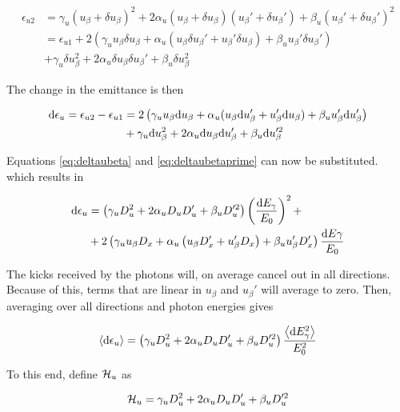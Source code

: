 \begin{align}
    \epsilon_{u2}   &= \gamma_u (u_\beta + \delta u_\beta)^2 + 2 \alpha_u (u_\beta + \delta u_\beta)(u_\beta' + \delta u_\beta') + \beta_u (u_\beta' + \delta u_\beta')^2\\
                    &= \epsilon_{u1} + 2 \left( \gamma_u u_\beta \delta u_\beta + \alpha_u (u_\beta \delta u_\beta' + u_\beta' \delta u_\beta) + \beta_u u_\beta' \delta u_\beta' \right)\\
                    &+ \gamma_u \delta u_\beta^2 + 2 \alpha_u \delta u_\beta \delta u_\beta' + \beta_u \delta u_\beta^2
\end{align}

The change in the emittance is then

\begin{align}
    \text{d} \epsilon_u = \epsilon_{u2} - \epsilon_{u1} &= 2 \left( \gamma_u u_\beta \text{d} u_\beta + \alpha_u (u_\beta \text{d} u_\beta' + u_\beta' \text{d} u_\beta) + \beta_u u_\beta' \text{d} u_\beta' \right)\\
                    &+ \gamma_u \text{d} u_\beta^2 + 2 \alpha_u \text{d} u_\beta \text{d} u_\beta' + \beta_u \text{d} u_\beta'^2
\end{align}

Equations \eqref{eq:deltaubeta} and \eqref{eq:deltaubetaprime} can now be substituted. which results in

\begin{align}
    \text{d} \epsilon_u &= \left( \gamma_u D_u^2 + 2 \alpha_u D_u D_u' + \beta_u D_u'^2 \right) \left( \frac{\text{d} E_\gamma}{E_0} \right)^2 +\\
                    &+ 2 \left( \gamma_u u_\beta D_x + \alpha_u \left( u_\beta D_x' + u_\beta' D_x \right) + \beta_u u_\beta'D_x' \right) \frac{\text{d} E\gamma}{E_0}
\end{align}

The kicks received by the photons will, on average cancel out in all directions.\cite{wiedemann2015particle} Because of this, terms that are linear in $u_\beta$ and $u_\beta'$ will average to zero. Then, averaging over all directions and photon energies gives

\begin{equation}
    \left\langle {\text{d}\epsilon_u} \right\rangle = \left( \gamma_u D_u^2 + 2 \alpha_u D_u D_u' + \beta_u D_u'^2 \right) \frac{\left\langle {\text{d}E_\gamma^2} \right\rangle}{E_0^2}
\end{equation}

To this end, define $\mathcal{H}_u$ as

\begin{equation}
    \mathcal{H}_u = \gamma_u D_u^2 + 2 \alpha_u D_u D_u' + \beta_u D_u'^2
\end{equation}

